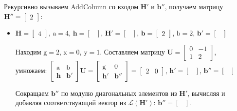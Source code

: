 \begin{enumerate}
Рекурсивно вызываем AddColumn со входом $ \mathbf{H}' $ и $ \mathbf{b}'' $, получаем матрицу $ \mathbf{H}'' = \left[\begin{array}{cccc}
2
\end{array}\right] $:
\begin{itemize}
\item $ \mathbf{H} = \left[\begin{array}{cccc}
4
\end{array}\right] $, $ \mathrm{a} = 4 $, $ \mathbf{h} = \left[\begin{array}{cccc}
\end{array}\right] $, $ \mathbf{H}' = \left[ \begin{array}{cccc}
\end{array}\right] $, $ \mathbf{b} = \left[\begin{array}{cccc}
2
\end{array}\right] $, $ \mathrm{b} = 2 $, $ \mathbf{b}' = \left[ \begin{array}{cccc}
\end{array}\right] $

Находим $ \mathrm{g} = 2 $, $ \mathrm{x} = 0 $, $ \mathrm{y} = 1 $. Составляем матрицу $  \mathbf{U} = \left[\begin{array}{cccc}
0 & -1 \\
1 & 2
\end{array}\right] $, умножаем: $ \left[ \begin{array}{cccc}
\mathrm{a} & \mathrm{b} \\
\mathbf{h} & \mathbf{b}' \end{array} \right] \mathbf{U}=
\left[ \begin{array}{cccc}
\mathrm{g} & \mathrm{0} \\
\mathbf{h}' & \mathbf{b}'' \end{array} \right] = \left[\begin{array}{cccc}
2 & 0
\end{array}\right] $, $ \mathbf{h}' = \left[\begin{array}{cccc}
\end{array}\right] $, $ \mathbf{b}'' = \left[\begin{array}{cccc}
\end{array}\right] $

Сокращаем $ \mathbf{b}'' $ по модулю диагональных элементов из $ \mathbf{H}' $, вычисляя и добавляя соответствующий вектор из $ \mathcal{L}(\mathbf{H}') $: $ \mathbf{b}'' = \left[ \begin{array}{cccc}
\end{array}\right] $.


\end{itemize}
\end{enumerate}
